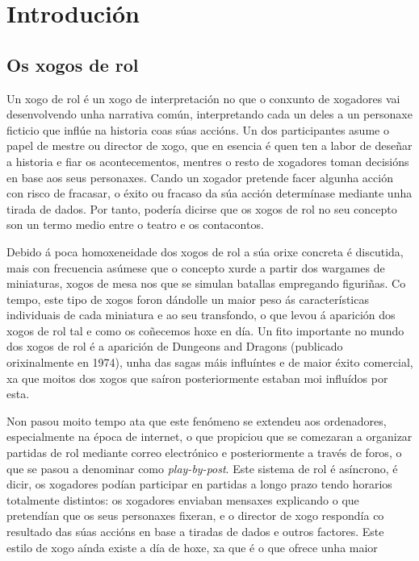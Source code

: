 \chapter{Introdución}

\section{Os xogos de rol}
Un xogo de rol é un xogo de interpretación no que o conxunto de xogadores vai
desenvolvendo unha narrativa común, interpretando cada un deles a un personaxe
ficticio que inflúe na historia coas súas accións. Un dos participantes asume o
papel de mestre ou director de xogo, que en esencia é  quen ten a
labor de deseñar a historia e fiar os acontecementos, mentres o resto de xogadores
toman decisións en base aos seus personaxes. Cando un xogador pretende facer
algunha acción con risco de fracasar, o éxito ou fracaso da súa acción
determínase mediante unha tirada de dados. Por tanto, podería dicirse que os
xogos de rol no seu concepto son un termo medio entre o teatro e os contacontos.
\par
Debido á poca homoxeneidade dos xogos de rol a súa orixe concreta é
discutida, mais con frecuencia asúmese que o concepto xurde a partir dos
wargames de miniaturas, xogos de mesa nos que se simulan batallas
empregando figuriñas\cite{gamingasculture}. Co tempo, este tipo de xogos foron
dándolle un maior peso ás características individuais de cada miniatura e ao seu
transfondo, o que levou á aparición dos xogos de rol tal e como os coñecemos
hoxe en día. Un fito importante no mundo dos xogos de rol é a aparición de
Dungeons and Dragons (publicado orixinalmente en 1974), unha das sagas máis
influíntes e de maior éxito comercial, xa que moitos dos xogos que saíron
posteriormente estaban moi influídos por esta.
\par
Non pasou moito tempo ata que este fenómeno se extendeu aos ordenadores,
especialmente na época de internet, o que propiciou que se comezaran a organizar
partidas de rol mediante correo electrónico e posteriormente a través de foros,
o que se pasou a denominar como {\it play-by-post}. Este sistema de rol é
asíncrono, é dicir, os xogadores podían participar en partidas a longo prazo
tendo horarios totalmente distintos: os xogadores enviaban mensaxes explicando o
que pretendían que os seus personaxes fixeran, e o director de xogo respondía co
resultado das súas accións en base a tiradas de dados e outros factores. Este
estilo de xogo aínda existe a día de hoxe, xa que é o que ofrece unha maior

